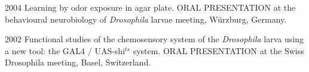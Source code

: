 \begin{itemize}
\begin{sloppypar}

\item[2004]
Learning by odor exposure in agar plate.
ORAL PRESENTATION at the
behavioural neurobiology of \textit{Drosophila} larvae meeting, W\"{u}rzburg,
Germany.


\item[2002]
Functional studies of the chemosensory system of the
\textit{Drosophila} larva  using a new tool: the GAL4 / UAS-shi$^{ts}$ system.
ORAL PRESENTATION at the Swiss Drosophila meeting, Basel, Switzerland.


\end{sloppypar}
\end{itemize}





